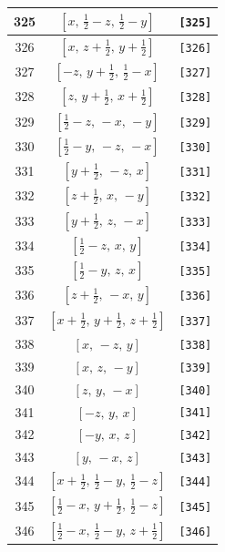 \documentclass[fleqn,8pt]{jsarticle}
\begin{document}
\begin{longtable}{ccc}
325 & $\left[ x,\, \frac{1}{2} - z,\, \frac{1}{2} - y \right]$ & {\tt [325]} \\ \hline
326 & $\left[ x,\, z + \frac{1}{2},\, y + \frac{1}{2} \right]$ & {\tt [326]} \\ \hline
327 & $\left[ - z,\, y + \frac{1}{2},\, \frac{1}{2} - x \right]$ & {\tt [327]} \\ \hline
328 & $\left[ z,\, y + \frac{1}{2},\, x + \frac{1}{2} \right]$ & {\tt [328]} \\ \hline
329 & $\left[ \frac{1}{2} - z,\, - x,\, - y \right]$ & {\tt [329]} \\ \hline
330 & $\left[ \frac{1}{2} - y,\, - z,\, - x \right]$ & {\tt [330]} \\ \hline
331 & $\left[ y + \frac{1}{2},\, - z,\, x \right]$ & {\tt [331]} \\ \hline
332 & $\left[ z + \frac{1}{2},\, x,\, - y \right]$ & {\tt [332]} \\ \hline
333 & $\left[ y + \frac{1}{2},\, z,\, - x \right]$ & {\tt [333]} \\ \hline
334 & $\left[ \frac{1}{2} - z,\, x,\, y \right]$ & {\tt [334]} \\ \hline
335 & $\left[ \frac{1}{2} - y,\, z,\, x \right]$ & {\tt [335]} \\ \hline
336 & $\left[ z + \frac{1}{2},\, - x,\, y \right]$ & {\tt [336]} \\ \hline
337 & $\left[ x + \frac{1}{2},\, y + \frac{1}{2},\, z + \frac{1}{2} \right]$ & {\tt [337]} \\ \hline
338 & $\left[ x,\, - z,\, y \right]$ & {\tt [338]} \\ \hline
339 & $\left[ x,\, z,\, - y \right]$ & {\tt [339]} \\ \hline
340 & $\left[ z,\, y,\, - x \right]$ & {\tt [340]} \\ \hline
341 & $\left[ - z,\, y,\, x \right]$ & {\tt [341]} \\ \hline
342 & $\left[ - y,\, x,\, z \right]$ & {\tt [342]} \\ \hline
343 & $\left[ y,\, - x,\, z \right]$ & {\tt [343]} \\ \hline
344 & $\left[ x + \frac{1}{2},\, \frac{1}{2} - y,\, \frac{1}{2} - z \right]$ & {\tt [344]} \\ \hline
345 & $\left[ \frac{1}{2} - x,\, y + \frac{1}{2},\, \frac{1}{2} - z \right]$ & {\tt [345]} \\ \hline
346 & $\left[ \frac{1}{2} - x,\, \frac{1}{2} - y,\, z + \frac{1}{2} \right]$ & {\tt [346]} \\ \hline

\end{longtable}
\end{document}
